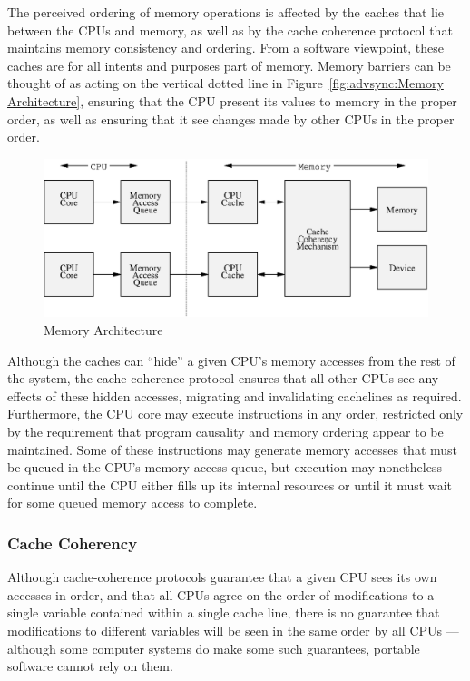 The perceived ordering of memory operations is affected by the caches
that lie between the CPUs and memory, as well as by the cache coherence
protocol that maintains memory consistency and ordering.
From a software viewpoint, these caches are for all intents and purposes
part of memory.
Memory barriers can be thought of as acting on the vertical dotted line in
Figure~\ref{fig:advsync:Memory Architecture}, ensuring that the CPU
present its values to memory in the proper order, as well as ensuring
that it see changes made by other CPUs in the proper order.

\begin{figure}[htb]
\begin{center}
\includegraphics{advsync/MemoryArchitecture}
\end{center}
\caption{Memory Architecture}
\end{figure}

Although the caches can ``hide'' a given CPU's memory accesses from the rest of
the system, the cache-coherence protocol ensures that all other CPUs see
any effects of these hidden accesses, migrating and invalidating cachelines
as required.
Furthermore, the CPU core may execute instructions in any order, restricted
only by the requirement that program causality and memory ordering
appear to be maintained.
Some of these instructions may generate memory accesses that must be queued
in the CPU's memory access queue, but execution may nonetheless continue
until the CPU either fills up its internal resources or until it must
wait for some queued memory access to complete.

\subsubsection{Cache Coherency}

Although cache-coherence protocols guarantee that a given CPU sees its
own accesses in order, and that all CPUs agree on the order of modifications
to a single variable contained within a single cache line, there is no
guarantee that modifications to different variables will be seen in
the same order by all CPUs --- although some computer systems do make
some such guarantees, portable software cannot rely on them.

